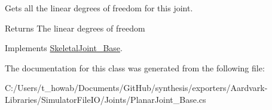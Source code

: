 Gets all the linear degrees of freedom for this joint. 

\begin{DoxyReturn}{Returns}
The linear degrees of freedom
\end{DoxyReturn}


Implements \hyperlink{class_skeletal_joint___base_a14564d8c44dfeef8b7a10044f2392cde}{Skeletal\+Joint\+\_\+\+Base}.



The documentation for this class was generated from the following file\+:\begin{DoxyCompactItemize}
\item 
C\+:/\+Users/t\+\_\+howab/\+Documents/\+Git\+Hub/synthesis/exporters/\+Aardvark-\/\+Libraries/\+Simulator\+File\+I\+O/\+Joints/Planar\+Joint\+\_\+\+Base.\+cs\end{DoxyCompactItemize}
